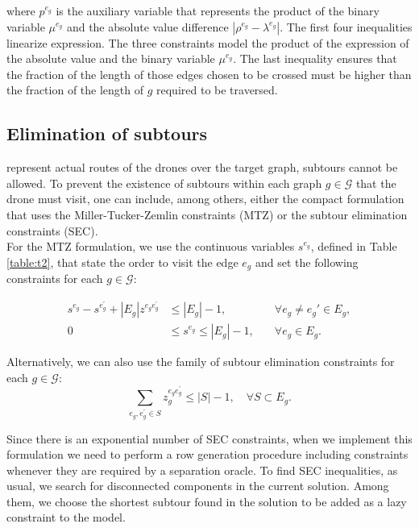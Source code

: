 where $p^{e_g}$ is the auxiliary variable that represents the product of the binary variable $\mu^{e_g}$ and the absolute value difference $|\rho^{e_g} - \lambda^{e_g}|$. The first four inequalities linearize  expression. The  three constraints model the product of the expression of the absolute value and the binary variable $\mu^{e_g}$. The last inequality ensures that the fraction of the length of those edges chosen to be crossed must be higher than the fraction of the length of $g$ required to be traversed.

\subsection*{Elimination of subtours}
\noindent
{} represent  actual routes of the drones over the target graph, subtours cannot be allowed.  To prevent the existence of subtours within each graph $g\in \mathcal G$ that the drone must visit, one can include, among others, either the compact formulation that uses the Miller-Tucker-Zemlin constraints (MTZ) or the subtour elimination constraints (SEC).\\
\noindent
For the MTZ formulation, we use the continuous variables $s^{e_g}$, defined in Table \ref{table:t2}, that state the order to visit the edge $e_g$ and set the following constraints for each $g\in\mathcal G$:

\begin{align}
    s^{e_g} - s^{e^\prime_g} + |E_g|z^{e_ge^\prime_g} & \leq |E_g| - 1  , &\quad\forall e_g \neq e_g'\in E_g, \tag{MTZ$_1$} \label{MTZ1}\\
    0 & \leq s^{e_g} \leq |E_g| - 1, &\quad\forall e_g\in E_g.\tag{MTZ$_2$}\label{MTZ2}
\end{align}

\noindent
Alternatively, we can also use the family of subtour elimination constraints for each $g\in\mathcal G$:
\begin{equation}\tag{SEC}\label{SEC}
    \sum_{e_g, e^\prime_g \in S} z_g^{e_ge^\prime_g} \leq |S| - 1, \quad \forall S\subset E_g.
\end{equation}

\noindent
Since there is an exponential number of SEC constraints, when we implement this formulation\RE{,} we need to perform a row generation procedure including constraints whenever they are required by a separation oracle. To find SEC inequalities, as usual, we search for disconnected components in the current solution. Among them, we choose the shortest subtour found in the solution to be added as a lazy constraint to the model.\\


